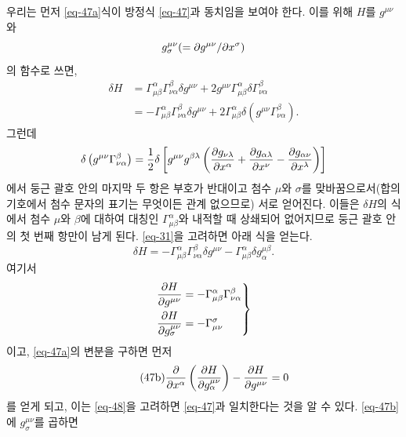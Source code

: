 \documentclass[b5paper]{article}
\begin{document}
우리는 먼저 \eqref{eq-47a}식이 방정식 \eqref{eq-47}과 동치임을 보여야 한다. 이를 위해 
$ H $를 $ g^{\mu\nu} $와 $$ g^{\mu\nu}_\sigma (= {{{\partial}{g^{\mu\nu}}}/{{\partial}{x^\sigma}}})$$의 함수로 쓰면, 
\begin{equation*}
	\begin{aligned}
	\delta H &= \Gamma_{\mu\beta}^{\alpha} \Gamma_{\nu\alpha}^{\beta}\delta g^{\mu\nu}
	    + 2 g^{\mu\nu} \Gamma_{\mu\beta}^{\alpha} \delta\Gamma_{\nu\alpha}^{\beta} \\
	    &= -\Gamma_{\mu\beta}^{\alpha} \Gamma_{\nu\alpha}^{\beta}\delta g^{\mu\nu}
	    + 2\Gamma_{\mu\beta}^{\alpha} \delta \left( g^{\mu\nu} \Gamma_{\nu\alpha}^{\beta} \right).
	\end{aligned}
\end{equation*}
그런데
\begin{equation*}
	 \delta \left( g^{\mu\nu} \Gamma_{\nu\alpha}^{\beta} \right)
	 = \frac{1}{2}\delta\left[ g^{\mu\nu} g^{\beta\lambda} 
	 \left(
	 	{\frac{{\partial}{g_{\nu\lambda}}}{{\partial}{x^\alpha}}}
	 	+ {\frac{{\partial}{g_{\alpha\lambda}}}{{\partial}{x^\nu}}}
	 	- {\frac{{\partial}{g_{\alpha\nu}}}{{\partial}{x^\lambda}}}
	 \right)
	 \right]
\end{equation*}
에서 둥근 괄호 안의 마지막 두 항은 부호가 반대이고 첨수 $\mu$와 $\sigma$를 맞바꿈으로서(합의 기호에서 첨수 문자의 표기는 무엇이든 관계 없으므로) 서로 얻어진다. 이들은 $ \delta H $의 식에서 첨수 $\mu$와 $\beta$에 대하여 대칭인 $\Gamma_{\mu\beta}^{\alpha}$와 내적할 때 상쇄되어 없어지므로 둥근 괄호 안의 첫 번째 항만이 남게 된다. \eqref{eq-31}을 고려하면 아래 식을 얻는다.
\begin{equation*}
	\delta H = -\Gamma_{\mu\beta}^{\alpha} \Gamma_{\nu\alpha}^{\beta} \delta g^{\mu\nu}
	-\Gamma_{\mu\beta}^{\alpha}\delta g_\alpha^{\mu\beta}.
\end{equation*}
여기서
\begin{equation} \label{eq-48}
\left.
\begin{aligned}
&{\frac{{\partial}{H}}{{\partial}{g^{\mu\nu}}}}=-\Gamma_{\mu\beta}^\alpha \Gamma_{\nu\alpha}^\beta\\
&{\frac{{\partial}{H}}{{\partial}{g_\sigma^{\mu\nu}}}}=-\Gamma_{\mu\nu}^\sigma
\end{aligned} \right\}
\end{equation}
이고, \eqref{eq-47a}의 변분을 구하면 먼저
\begin{equation} \tag{47b} \label{eq-47b}
	{\frac{{\partial}{}}{{\partial}{x^\alpha}}}\left({\frac{{\partial}{H}}{{\partial}{g_\alpha^{\mu\nu}}}}\right)-{\frac{{\partial}{H}}{{\partial}{g^{\mu\nu}}}}=0
\end{equation}
를 얻게 되고, 이는 \eqref{eq-48}을 고려하면 \eqref{eq-47}과 일치한다는 것을 알 수 있다.
\eqref{eq-47b}에 $g_\sigma^{\mu\nu}$를 곱하면
\end{document}
